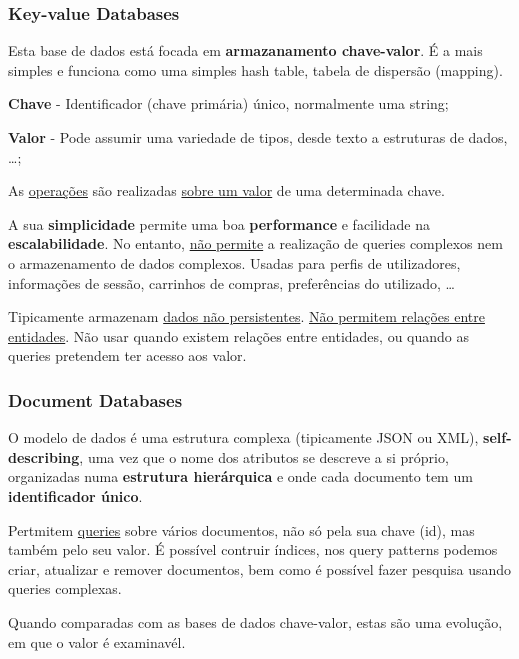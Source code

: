 \documentclass{article}
\begin{document}
\subsubsection{Key-value Databases}

Esta base de dados está focada em \textbf{armazanamento chave-valor}. É a mais simples
e funciona como uma simples hash table, tabela de dispersão (mapping).

\begin{flushleft}
  \textbf{Chave} - Identificador (chave primária) único, normalmente uma string;
  
  \textbf{Valor} - Pode assumir uma variedade de tipos, desde texto a estruturas de dados, \dots;
\end{flushleft}

As \uline{operações} são realizadas \uline{sobre um valor} de uma determinada chave.

A sua \textbf{simplicidade} permite uma boa \textbf{performance} e facilidade na \textbf{escalabilidade}. No entanto,
\uline{não permite} a realização de
queries complexos nem o armazenamento de dados complexos.
Usadas para perfis de utilizadores, informações de sessão, carrinhos de compras, preferências do utilizado, \dots

Tipicamente armazenam \uline{dados não persistentes}. \uline{Não permitem relações entre entidades}.
Não usar quando existem relações entre entidades, ou quando as queries pretendem
ter acesso aos valor.

\subsubsection{Document Databases}

O modelo de dados é uma estrutura complexa (tipicamente JSON ou XML), \textbf{self-describing},
uma vez que o nome dos atributos se descreve a si próprio, organizadas
numa \textbf{estrutura hierárquica} e onde cada documento tem um \textbf{identificador único}.

Pertmitem \uline{queries} sobre vários documentos, não só pela sua chave (id),
mas também pelo seu valor. É possível contruir índices, nos query patterns
podemos criar, atualizar e remover documentos, bem como é possível fazer
pesquisa usando queries complexas.

Quando comparadas com as bases de dados chave-valor, estas são uma evolução,
em que o valor é examinavél.
\end{document}
